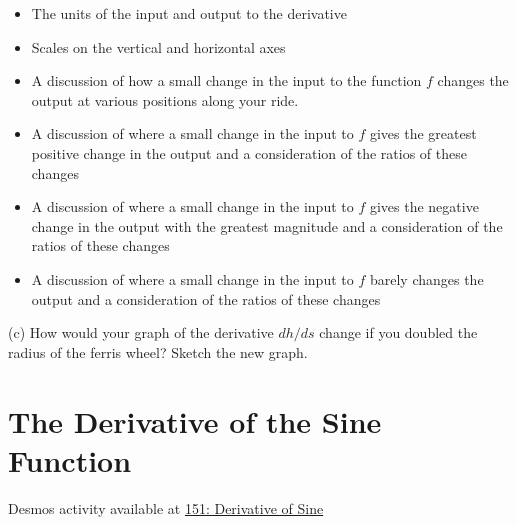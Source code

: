 \documentclass{ximera}
\begin{document}
\begin{question}
\begin{itemize}
\item{The units of the input and output to the derivative}

\item{Scales on the vertical and horizontal axes}

\item{A discussion of how a small change in the input to the function $f$ changes the output at various positions along your ride. }

\item{A discussion of where a small change in the input to $f$ gives the greatest positive change in the output and a consideration of the ratios of these changes }

\item{A discussion of where a small change in the input to $f$ gives the negative change in the output with the greatest magnitude and a consideration of the ratios of these changes }

\item{A discussion of where a small change in the input to $f$ barely changes the output and a consideration of the ratios of these changes }

\end{itemize}

(c) How would your graph of the derivative $dh/ds$ change if you doubled the radius of the ferris wheel? Sketch the new graph.

\begin{onlineOnly}
    \begin{center}
\end{center}
\end{onlineOnly}




\end{question}




\section{The Derivative of the Sine Function}


\begin{question}   \label{Qdgbdgh443}
\begin{onlineOnly}
    \begin{center}
\end{center}
\end{onlineOnly}

Desmos activity available at \href{https://www.desmos.com/calculator/jcmcyrpndw}{151: Derivative of Sine}
\end{question}
\end{document}
